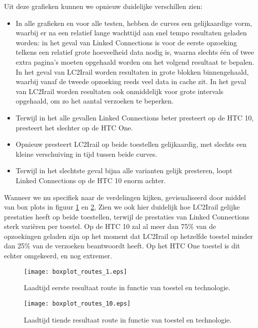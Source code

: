 Uit deze grafieken kunnen we opnieuw duidelijke verschillen zien:
\begin{itemize}
	\item In alle grafieken en voor alle testen, hebben de curves een gelijkaardige vorm, waarbij er na een relatief lange wachttijd aan snel tempo resultaten geladen worden: in het geval van Linked Connections is voor de eerste opzoeking telkens een relatief grote hoeveelheid data nodig is, waarna slechts één of twee extra pagina's moeten opgehaald worden om het volgend resultaat te bepalen. In het geval van LC2Irail worden resultaten in grote blokken binnengehaald, waarbij vanaf de tweede opzoeking reeds veel data in cache zit. In het geval van LC2Irail worden resultaten ook onmiddelijk voor grote intervals opgehaald, om zo het aantal verzoeken te beperken. 
	\item Terwijl in het alle gevallen Linked Connections beter presteert op de HTC 10, presteert het slechter op de HTC One. 
	\item Opnieuw presteert LC2Irail op beide toestellen gelijkaardig, met slechts een kleine verschuiving in tijd tussen beide curves.
	\item Terwijl in het slechtste geval bijna alle varianten gelijk presteren, loopt Linked Connections op de HTC 10 enorm achter.
\end{itemize}

Wanneer we nu specifiek naar de verdelingen kijken, gevisualiseerd door middel van box plots in figuur \ref{fig:routesBoxplot1} en \ref{fig:routesBoxplot10}, Zien we ook hier duidelijk hoe LC2Irail gelijke prestaties heeft op beide toestellen, terwijl de prestaties van Linked Connections sterk variëren per toestel. Op de HTC 10 zal al meer dan 75\% van de opzoekingen geladen zijn op het moment dat LC2Irail op hetzelfde toestel minder dan 25\% van de verzoeken beantwoordt heeft. Op het HTC One toestel is dit echter omgekeerd, en nog extremer. 

\begin{figure}[h]
	\centering
	\texttt{[image: boxplot\_routes\_1.eps]}
	\caption[Laadtijd eerste resultaat route in functie van toestel en technologie]{Laadtijd eerste resultaat route in functie van toestel en technologie.}
	\label{fig:routesBoxplot1}
\end{figure}

\begin{figure}[h]
	\centering
	\texttt{[image: boxplot\_routes\_10.eps]}
	\caption[Laadtijd tiende resultaat route in functie van toestel en technologie]{Laadtijd tiende resultaat route in functie van toestel en technologie.}
	\label{fig:routesBoxplot10}
\end{figure}


